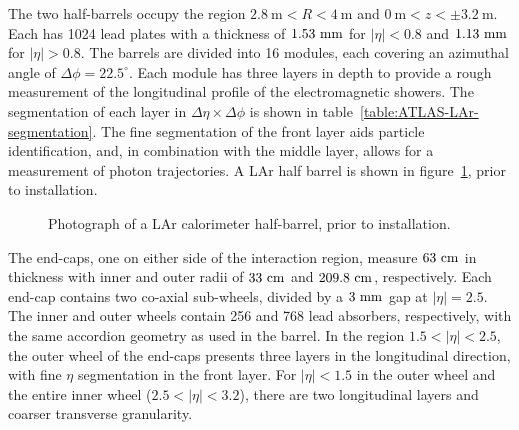 The two half-barrels occupy the region $2.8~\mbox{m}<R<4~\mbox{m}$ and $0~\mbox{m}<z<\pm3.2~\mbox{m}$. Each has 1024 lead plates with a thickness of $1.53~\mathrm{mm}$ for $|\eta|<0.8$ and $1.13~\mathrm{mm}$ for $|\eta|>0.8$. The barrels are divided into 16 modules, each covering an azimuthal angle of $\Delta \phi = 22.5^{\circ}$. Each module has three layers in depth to provide a rough measurement of the longitudinal profile of the electromagnetic showers. The segmentation of each layer in $\Delta\eta\times\Delta\phi$ is shown in table~\ref{table:ATLAS-LAr-segmentation}. The fine segmentation of the front layer aids particle identification, and, in combination with the middle layer, allows for a measurement of photon trajectories. A LAr half barrel is shown in figure~\ref{fig:LAr-barrel}, prior to installation.

\begin{figure}[htbp]
	\centering
	\caption{Photograph of a LAr calorimeter half-barrel, prior to installation.}
	\label{fig:LAr-barrel}
\end{figure}


The end-caps, one on either side of the interaction region, measure $63~\mathrm{cm}$ in thickness with inner and outer radii of $33~\mathrm{cm}$ and $209.8~\mathrm{cm}$, respectively. Each end-cap contains two co-axial sub-wheels, divided by a $3~\mathrm{mm}$ gap at $|\eta|=2.5$. The inner and outer wheels contain 256 and 768 lead absorbers, respectively, with the same accordion geometry as used in the barrel. In the region $1.5<|\eta|<2.5$, the outer wheel of the end-caps presents three layers in the longitudinal direction, with fine $\eta$ segmentation in the front layer. For $|\eta|<1.5$ in the outer wheel and the entire inner wheel ($2.5<|\eta|<3.2$), there are two longitudinal layers and coarser transverse granularity.

